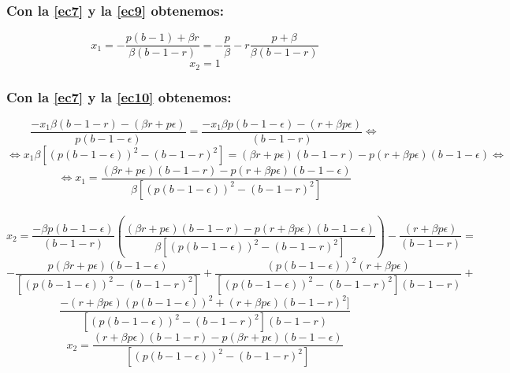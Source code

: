 \documentclass[11pt]{article}
\begin{document}
\subsubsection*{Con la \autoref{ec7} y la \autoref{ec9} obtenemos:}
\vspace{-0.5cm}
\begin{equation}\label{ec25}
x_1=-\dfrac{p(b-1)+\beta r}{\beta(b-1-r)}=-\dfrac{p}{\beta}-r\dfrac{p+\beta}{\beta(b-1-r)}
\end{equation}
\begin{equation}\label{ec26}
x_2=1
\end{equation}


\subsubsection*{Con la \autoref{ec7} y la \autoref{ec10} obtenemos:}
\vspace{-0.5cm}
\begin{equation*}
\dfrac{-x_1\beta(b-1-r)-(\beta r+p\epsilon)}{p(b-1-\epsilon)}=\dfrac{-x_1\beta p(b-1-\epsilon)-(r+\beta p\epsilon)}{(b-1-r)}\Longleftrightarrow
\end{equation*}
\begin{equation*}
\Longleftrightarrow x_1\beta[(p(b-1-\epsilon))^2-(b-1-r)^2]=(\beta r+p\epsilon)(b-1-r)-p(r+\beta p\epsilon)(b-1-\epsilon)\Longleftrightarrow
\end{equation*}
\begin{equation}\label{ec27}
\Longleftrightarrow x_1=\dfrac{(\beta r+p\epsilon)(b-1-r)-p(r+\beta p\epsilon)(b-1-\epsilon)}{\beta[(p(b-1-\epsilon))^2-(b-1-r)^2]}
\end{equation}\\
\begin{equation*}
x_2=\dfrac{-\beta p(b-1-\epsilon)}{(b-1-r)}\left(\dfrac{(\beta r+p\epsilon)(b-1-r)-p(r+\beta p\epsilon)(b-1-\epsilon)}{\beta[(p(b-1-\epsilon))^2-(b-1-r)^2]}\right)-\dfrac{(r+\beta p\epsilon)}{(b-1-r)}=
\end{equation*}
\begin{equation*}
-\dfrac{p(\beta r+p\epsilon)(b-1-\epsilon)}{[(p(b-1-\epsilon))^2-(b-1-r)^2]}+\dfrac{(p(b-1-\epsilon))^2(r+\beta p\epsilon)}{[(p(b-1-\epsilon))^2-(b-1-r)^2](b-1-r)}+
\end{equation*}
\begin{equation*}
\dfrac{-(r+\beta p\epsilon)(p(b-1-\epsilon))^2+(r+\beta p\epsilon)(b-1-r)^2]}{[(p(b-1-\epsilon))^2-(b-1-r)^2](b-1-r)}
\end{equation*}
\begin{equation}\label{ec28}
x_2=\dfrac{(r+\beta p\epsilon)(b-1-r)-p(\beta r+p\epsilon)(b-1-\epsilon)}{[(p(b-1-\epsilon))^2-(b-1-r)^2]}
\end{equation}
\end{document}
